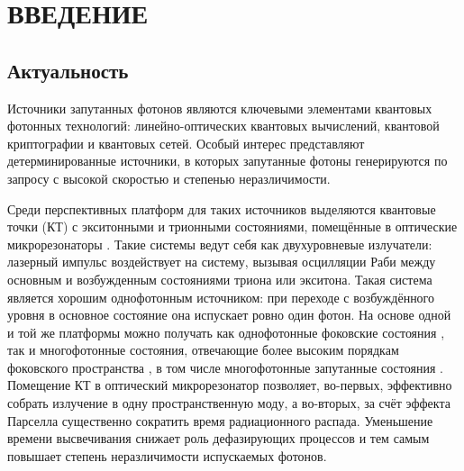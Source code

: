 \documentclass[11pt]{article}    %
\numberwithin{equation}{section}
\begin{document}
\setcounter{page}{2}


\tableofcontents

\restoregeometry
\newpage

\section*{ВВЕДЕНИЕ}
\subsection*{Актуальность}
Источники запутанных фотонов являются ключевыми элементами
квантовых фотонных технологий: линейно-оптических квантовых вычислений,
квантовой криптографии и квантовых сетей.
Особый интерес представляют детерминированные источники, в которых запутанные
фотоны генерируются по запросу с высокой скоростью и степенью неразличимости.

Среди перспективных платформ для таких источников выделяются
квантовые точки (КТ) с экситонными и трионными состояниями, помещённые в оптические
микрорезонаторы \cite{rakhlin2023}.
Такие системы ведут себя как двухуровневые излучатели: лазерный импульс
воздействует на систему,
вызывая осцилляции Раби между основным и возбужденным состояниями триона или экситона. %
Такая система является хорошим однофотонным источником:
при переходе с возбуждённого уровня в основное состояние она испускает ровно один фотон.
На основе одной и той же платформы можно получать как однофотонные фоковские
состояния \cite{senellart2017, tomm2021, rakhlin2023}, так и многофотонные
состояния, отвечающие более высоким порядкам фоковского пространства
\cite{fischer2017, fischer2018, loredo2019}, в том числе многофотонные
запутанные состояния \cite{tiurev2022, huet2025}.
Помещение КТ в оптический микрорезонатор позволяет, во-первых,
эффективно собрать излучение в одну пространственную моду, а во-вторых,
за счёт эффекта Парселла существенно сократить время радиационного распада.
Уменьшение времени высвечивания снижает роль дефазирующих процессов
и тем самым повышает степень неразличимости испускаемых фотонов.
\end{document}
